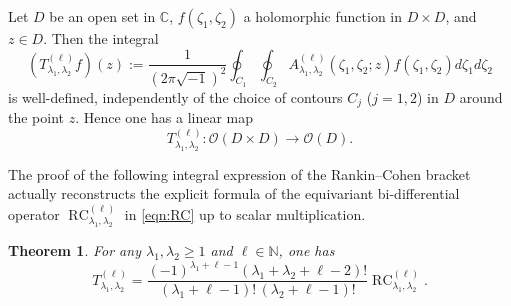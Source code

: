 \documentclass[12pt]{amsart}
\newcommand{\RC}{\operatorname{RC}}
\theoremstyle{plain} %
\newtheorem{theorem}{Theorem}
\theoremstyle{definition} %
\theoremstyle{remark} %
\begin{document}
Let $D$ be an open set in ${\mathbb{C}}$, 
 $f(\zeta_1, \zeta_2)$ a holomorphic function
 in $D \times D$, 
 and $z \in D$.  
Then the integral
\begin{equation}
\label{eqn:Tl}
   (T_{\lambda_1, \lambda_2}^{(\ell)} f)(z)
   :=
   \frac 1 {(2 \pi \sqrt{-1})^2}
   \oint_{C_1} \oint_{C_2}
   A_{\lambda_1, \lambda_2}^{(\ell)}(\zeta_1, \zeta_2;z)
   f(\zeta_1,\zeta_2) d \zeta_1 d \zeta_2
\end{equation}
is well-defined, 
 independently of the choice of contours $C_j$  ($j=1,2$)
 in $D$ around the point $z$.  
Hence one has a linear map
\[
   T_{\lambda_1, \lambda_2}^{(\ell)} \colon 
   {\mathcal{O}}(D \times D) \to {\mathcal{O}}(D).  
\]

The proof of the following integral expression of the Rankin--Cohen bracket
 actually reconstructs the explicit formula
 of the equivariant bi-differential operator 
 $\RC_{\lambda_1, \lambda_2}^{(\ell)}$
 in \eqref{eqn:RC}
 up to scalar multiplication.  



\begin{theorem}
\label{thm:RCresidue}
For any $\lambda_1, \lambda_2 \ge 1$ and $\ell \in {\mathbb{N}}$,
 one has
\begin{equation*}
   T_{\lambda_1, \lambda_2}^{(\ell)}
=
 \frac {(-1)^{\lambda_1+\ell-1}(\lambda_1 + \lambda_2 + \ell -2) ! }
       {(\lambda_1+\ell-1) ! \, (\lambda_2 + \ell -1)!}
\RC_{\lambda_1, \lambda_2}^{(\ell)}.  
\end{equation*}
\end{theorem}
\end{document}
